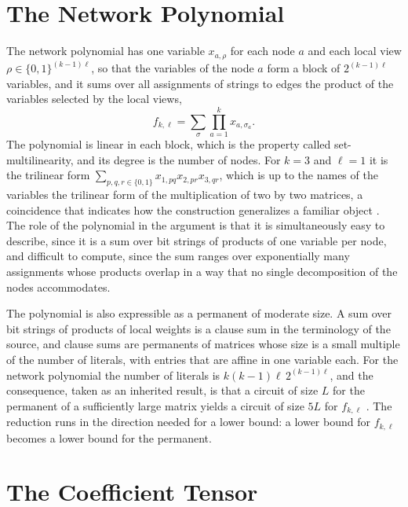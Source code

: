 \documentclass[11pt,letterpaper]{report}
\theoremstyle{plain}
\theoremstyle{definition}
\theoremstyle{remark}
\begin{document}
\section{The Network Polynomial}

The network polynomial has one variable $x_{a,\rho}$ for each node $a$ and each local view $\rho\in\{0,1\}^{(k-1)\ell}$, so that the variables of the node $a$ form a block of $2^{(k-1)\ell}$ variables, and it sums over all assignments of strings to edges the product of the variables selected by the local views,
\[
f_{k,\ell}=\sum_{\sigma}\prod_{a=1}^{k}x_{a,\sigma_a}.
\]
The polynomial is linear in each block, which is the property called set-multilinearity, and its degree is the number of nodes. For $k=3$ and $\ell=1$ it is the trilinear form $\sum_{p,q,r\in\{0,1\}}x_{1,pq}x_{2,pr}x_{3,qr}$, which is up to the names of the variables the trilinear form of the multiplication of two by two matrices, a coincidence that indicates how the construction generalizes a familiar object \cite{Source2026}. The role of the polynomial in the argument is that it is simultaneously easy to describe, since it is a sum over bit strings of products of one variable per node, and difficult to compute, since the sum ranges over exponentially many assignments whose products overlap in a way that no single decomposition of the nodes accommodates.

The polynomial is also expressible as a permanent of moderate size. A sum over bit strings of products of local weights is a clause sum in the terminology of the source, and clause sums are permanents of matrices whose size is a small multiple of the number of literals, with entries that are affine in one variable each. For the network polynomial the number of literals is $k(k-1)\ell\,2^{(k-1)\ell}$, and the consequence, taken as an inherited result, is that a circuit of size $L$ for the permanent of a sufficiently large matrix yields a circuit of size $5L$ for $f_{k,\ell}$ \cite{Source2026}. The reduction runs in the direction needed for a lower bound: a lower bound for $f_{k,\ell}$ becomes a lower bound for the permanent.

\section{The Coefficient Tensor}
\end{document}
